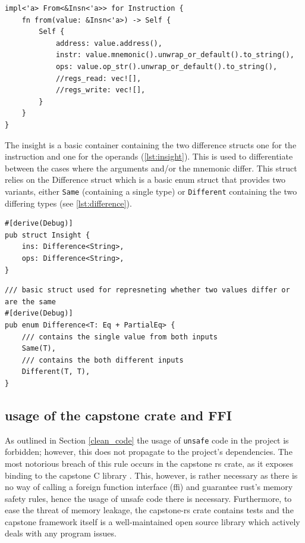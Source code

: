 \begin{lstlisting}
impl<'a> From<&Insn<'a>> for Instruction {
    fn from(value: &Insn<'a>) -> Self {
        Self {
            address: value.address(),
            instr: value.mnemonic().unwrap_or_default().to_string(),
            ops: value.op_str().unwrap_or_default().to_string(),
            //regs_read: vec![],
            //regs_write: vec![],
        }
    }
}
\end{lstlisting}

The insight is a basic container containing the two difference structs one for the instruction and one for the operands (\autoref{lst:insight}). 
This is used to differentiate between the cases where the arguments and/or the mnemonic differ. 
This struct relies on the Difference struct which is a basic enum struct that provides two variants, either \verb|Same| (containing a single type) or \verb|Different| containing the two differing types (see \autoref{lst:difference}).

\begin{lstlisting}[caption=\label{lst:insight}"The insight struct definition"]
    #[derive(Debug)]
pub struct Insight {
    ins: Difference<String>,
    ops: Difference<String>,
}
\end{lstlisting}

\begin{lstlisting}[caption=\label{lst:difference}"The Difference generic struct definition"]
    /// basic struct used for represneting whether two values differ or are the same
#[derive(Debug)]
pub enum Difference<T: Eq + PartialEq> {
    /// contains the single value from both inputs
    Same(T),
    /// contains the both different inputs
    Different(T, T),
}
\end{lstlisting}

\subsection{usage of the capstone crate and FFI}

As outlined in Section \autoref{clean_code} the usage of \verb|unsafe| code in the project is forbidden; however, this does not propagate to the project's dependencies.
The most notorious breach of this rule occurs in the capstone rs crate, as it exposes binding to the capstone C library \cite{finkenauer_capstone-rustcapstone-rs_nodate}.
This, however, is rather necessary as there is no way of calling a foreign function interface (ffi) and guarantee rust's memory safety rules, hence the usage of unsafe code there is necessary.
Furthermore, to ease the threat of memory leakage, the capstone-rs crate contains tests and the capstone framework itself is a well-maintained open source library which actively deals with any program issues.

